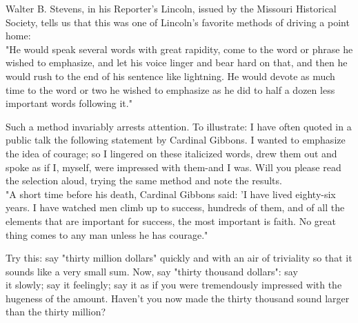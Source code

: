 \documentclass[10pt]{article}
\begin{document}
Walter B. Stevens, in his Reporter's Lincoln, issued by the Missouri Historical Society, tells us that this was one of Lincoln's favorite methods of driving a point home:\\
"He would speak several words with great rapidity, come to the word or phrase he wished to emphasize, and let his voice linger and bear hard on that, and then he would rush to the end of his sentence like lightning. He would devote as much time to the word or two he wished to emphasize as he did to half a dozen less important words following it."

Such a method invariably arrests attention. To illustrate: I have often quoted in a public talk the following statement by Cardinal Gibbons. I wanted to emphasize the idea of courage; so I lingered on these italicized words, drew them out and spoke as if I, myself, were impressed with them-and I was. Will you please read the selection aloud, trying the same method and note the results.\\
"A short time before his death, Cardinal Gibbons said: 'I have lived eighty-six years. I have watched men climb up to success, hundreds of them, and of all the elements that are important for success, the most important is faith. No great thing comes to any man unless he has courage."

Try this: say "thirty million dollars" quickly and with an air of triviality so that it sounds like a very small sum. Now, say "thirty thousand dollars": say\\
it slowly; say it feelingly; say it as if you were tremendously impressed with the hugeness of the amount. Haven't you now made the thirty thousand sound larger than the thirty million?
\end{document}
